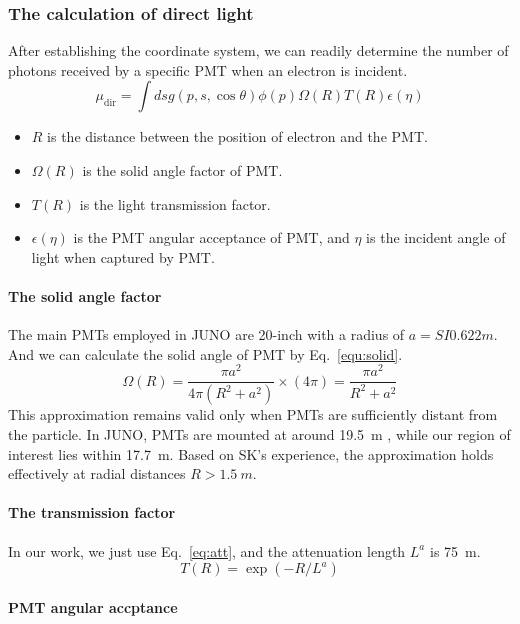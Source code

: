 \subsubsection{The calculation of direct light}
After establishing the coordinate system, we can readily determine the number of photons received by a specific PMT when an electron is incident.
\begin{equation}
	\mu_{\mathrm{dir}}=\int ds g(p,s,\cos\theta)\phi(p)\Omega(R)T(R)\epsilon(\eta)
	\label{equ:directLight}
\end{equation}
\begin{itemize}
	\item $R$ is the distance between the position of electron and the PMT.
	\item $\Omega(R)$ is the solid angle factor of PMT.
	\item $T(R)$ is the light transmission factor.
	\item $\epsilon(\eta)$ is the PMT angular acceptance of PMT, and $\eta$ is the incident angle of light when captured by PMT.
\end{itemize}

\paragraph{The solid angle factor}
The main PMTs employed in JUNO are 20-inch with a radius of $a=SI{0.622}{m}$. And we can calculate the solid angle of PMT by Eq.~\eqref{equ:solid}.
\begin{equation}
	\Omega(R)=\frac{\pi a^2}{4\pi(R^2+a^2)}\times (4\pi)=\frac{\pi a^2}{R^2+a^2}
	\label{equ:solid}
\end{equation}
This approximation remains valid only when PMTs are sufficiently distant from the particle. In JUNO, PMTs are mounted at around \SI{19.5}{m} , while our region of interest lies within \SI{17.7}{m}. Based on SK's experience, the approximation holds effectively at radial distances $R > \SI{1.5}{m}$.

\paragraph{The transmission factor}
In our work, we just use Eq.~\eqref{eq:att}, and the attenuation length $L^{a}$ is \SI{75}{m}.
\begin{equation}
	T(R) = \exp(-R/L^{a})
	\label{eq:att}
\end{equation}

\paragraph{PMT angular accptance}


